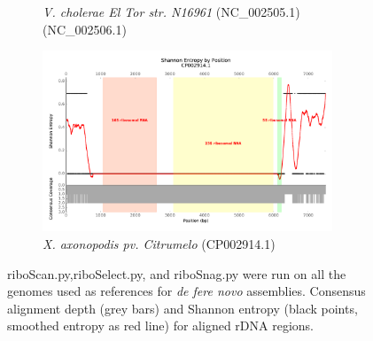 \documentclass[10pt]{article}
\begin{document}
\begin{figure}
\begin{subfigure}[b]{.45\textwidth}
    \caption{\textit{V. cholerae El Tor str. N16961} (NC\_002505.1) (NC\_002506.1)}
    \label{fig:ent_vib}
  \end{subfigure}
  \begin{subfigure}[b]{.45\textwidth}
    \includegraphics[width=0.95\textwidth]{gage_entropy_figures/CP002914.1_entropy_plot}
    \caption{\textit{X. axonopodis pv. Citrumelo} (CP002914.1)}
  \end{subfigure}
  \caption{riboScan.py,riboSelect.py, and riboSnag.py were run on all the genomes used as references for \textit{de fere novo} assemblies. Consensus alignment depth (grey bars) and Shannon entropy (black points, smoothed entropy as red line) for aligned rDNA regions.}
  \label{fig:ent_gage}

\end{figure}
\end{document}
